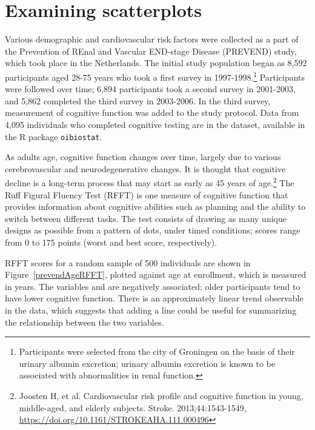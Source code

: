 

\section{Examining scatterplots}
\label{examiningScatterPlots}



Various demographic and cardiovascular risk factors were collected as a part of the Prevention of REnal and Vascular END-stage Disease (PREVEND) study, which took place in the Netherlands. The initial study population began as 8,592 participants aged 28-75 years who took a first survey in 1997-1998.\footnote{Participants were selected from the city of Groningen on the basis of their urinary albumin excretion; urinary albumin excretion is known to be associated with abnormalities in renal function.} Participants were followed over time; 6,894 participants took a second survey in 2001-2003, and 5,862 completed the third survey in 2003-2006. In the third survey, measurement of cognitive function was added to the study protocol. Data from 4,095 individuals who completed cognitive testing are in the  dataset, available in the \textsf{R} package  \texttt{oibiostat}. 

As adults age, cognitive function changes over time, largely due to various cerebrovascular and neurodegenerative changes. It is thought that cognitive decline is a long-term process that may start as early as 45 years of age.\footnote{Joosten H, et al. Cardiovascular risk profile and cognitive function in young, middle-aged, and elderly subjects. Stroke. 2013;44:1543-1549, \url{https://doi.org/10.1161/STROKEAHA.111.000496} } The Ruff Figural Fluency Test (RFFT) is one measure of cognitive function that provides information about cognitive abilities such as planning and the ability to switch between different tasks. The test consists of drawing as many unique designs as possible from a pattern of dots, under timed conditions; scores range from 0 to 175 points (worst and best score, respectively).

RFFT scores for a random sample of 500 individuals are shown in Figure~\ref{prevendAgeRFFT}, plotted against age at enrollment, which is measured in years. The variables  and  are negatively associated; older participants tend to have lower cognitive function. There is an approximately linear trend observable in the data, which suggests that adding a line could be useful for summarizing the relationship between the two variables.

